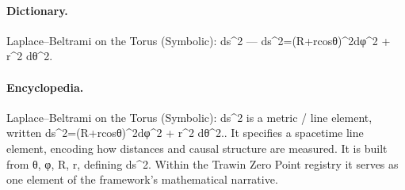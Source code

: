 \paragraph{Dictionary.}
Laplace–Beltrami on the Torus (Symbolic): ds\textasciicircum{}2 — ds\textasciicircum{}2=(R+rcosθ)\textasciicircum{}2dφ\textasciicircum{}2 + r\textasciicircum{}2 dθ\textasciicircum{}2.

\paragraph{Encyclopedia.}
Laplace–Beltrami on the Torus (Symbolic): ds\textasciicircum{}2 is a metric / line element, written ds\textasciicircum{}2=(R+rcosθ)\textasciicircum{}2dφ\textasciicircum{}2 + r\textasciicircum{}2 dθ\textasciicircum{}2.. It specifies a spacetime line element, encoding how distances and causal structure are measured. It is built from θ, φ, R, r, defining ds\textasciicircum{}2. Within the Trawin Zero Point registry it serves as one element of the framework's mathematical narrative.
